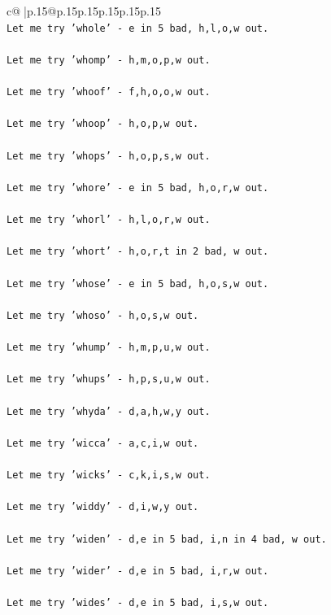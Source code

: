 \documentclass{article}
\begin{document}
{\begin{supertabular}{c@{$\;$}|p{.15\linewidth}@{}p{.15\linewidth}p{.15\linewidth}p{.15\linewidth}p{.15\linewidth}p{.15\linewidth}}
{{{\\ 
\texttt{Let me try 'whole' {-} e in 5 bad, h,l,o,w out. } \\
\\ 
\texttt{Let me try 'whomp' {-} h,m,o,p,w out. } \\
\\ 
\texttt{Let me try 'whoof' {-} f,h,o,o,w out. } \\
\\ 
\texttt{Let me try 'whoop' {-} h,o,p,w out. } \\
\\ 
\texttt{Let me try 'whops' {-} h,o,p,s,w out. } \\
\\ 
\texttt{Let me try 'whore' {-} e in 5 bad, h,o,r,w out. } \\
\\ 
\texttt{Let me try 'whorl' {-} h,l,o,r,w out. } \\
\\ 
\texttt{Let me try 'whort' {-} h,o,r,t in 2 bad, w out. } \\
\\ 
\texttt{Let me try 'whose' {-} e in 5 bad, h,o,s,w out. } \\
\\ 
\texttt{Let me try 'whoso' {-} h,o,s,w out. } \\
\\ 
\texttt{Let me try 'whump' {-} h,m,p,u,w out. } \\
\\ 
\texttt{Let me try 'whups' {-} h,p,s,u,w out. } \\
\\ 
\texttt{Let me try 'whyda' {-} d,a,h,w,y out. } \\
\\ 
\texttt{Let me try 'wicca' {-} a,c,i,w out. } \\
\\ 
\texttt{Let me try 'wicks' {-} c,k,i,s,w out. } \\
\\ 
\texttt{Let me try 'widdy' {-} d,i,w,y out. } \\
\\ 
\texttt{Let me try 'widen' {-} d,e in 5 bad, i,n in 4 bad, w out. } \\
\\ 
\texttt{Let me try 'wider' {-} d,e in 5 bad, i,r,w out. } \\
\\ 
\texttt{Let me try 'wides' {-} d,e in 5 bad, i,s,w out. } \\
}}}
\end{supertabular}}
\end{document}
